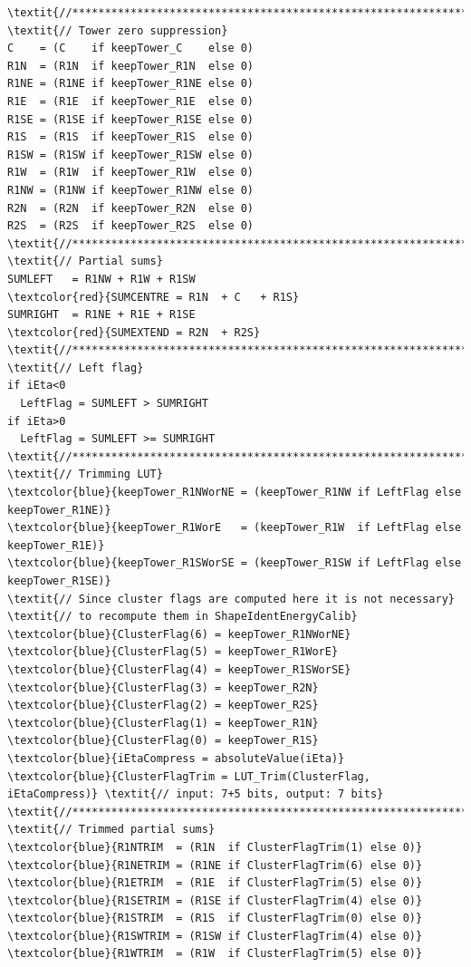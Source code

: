 \documentclass[a4paper, 12pt]{article}
\begin{document}
\begin{Verbatim}[label={EG cluster energy sums}]
\textit{//******************************************************************//}
\textit{// Tower zero suppression}
C    = (C    if keepTower_C    else 0)
R1N  = (R1N  if keepTower_R1N  else 0)
R1NE = (R1NE if keepTower_R1NE else 0)
R1E  = (R1E  if keepTower_R1E  else 0)
R1SE = (R1SE if keepTower_R1SE else 0)
R1S  = (R1S  if keepTower_R1S  else 0)
R1SW = (R1SW if keepTower_R1SW else 0)
R1W  = (R1W  if keepTower_R1W  else 0)
R1NW = (R1NW if keepTower_R1NW else 0)
R2N  = (R2N  if keepTower_R2N  else 0)
R2S  = (R2S  if keepTower_R2S  else 0)
\textit{//******************************************************************//}
\textit{// Partial sums}
SUMLEFT   = R1NW + R1W + R1SW
\textcolor{red}{SUMCENTRE = R1N  + C   + R1S}
SUMRIGHT  = R1NE + R1E + R1SE
\textcolor{red}{SUMEXTEND = R2N  + R2S}
\textit{//******************************************************************//}
\textit{// Left flag}
if iEta<0
  LeftFlag = SUMLEFT > SUMRIGHT
if iEta>0
  LeftFlag = SUMLEFT >= SUMRIGHT
\textit{//******************************************************************//}
\textit{// Trimming LUT}
\textcolor{blue}{keepTower_R1NWorNE = (keepTower_R1NW if LeftFlag else keepTower_R1NE)}
\textcolor{blue}{keepTower_R1WorE   = (keepTower_R1W  if LeftFlag else keepTower_R1E)}
\textcolor{blue}{keepTower_R1SWorSE = (keepTower_R1SW if LeftFlag else keepTower_R1SE)}
\textit{// Since cluster flags are computed here it is not necessary}
\textit{// to recompute them in ShapeIdentEnergyCalib}
\textcolor{blue}{ClusterFlag(6) = keepTower_R1NWorNE}
\textcolor{blue}{ClusterFlag(5) = keepTower_R1WorE}
\textcolor{blue}{ClusterFlag(4) = keepTower_R1SWorSE}
\textcolor{blue}{ClusterFlag(3) = keepTower_R2N}
\textcolor{blue}{ClusterFlag(2) = keepTower_R2S}
\textcolor{blue}{ClusterFlag(1) = keepTower_R1N}
\textcolor{blue}{ClusterFlag(0) = keepTower_R1S}
\textcolor{blue}{iEtaCompress = absoluteValue(iEta)}
\textcolor{blue}{ClusterFlagTrim = LUT_Trim(ClusterFlag, iEtaCompress)} \textit{// input: 7+5 bits, output: 7 bits}
\textit{//******************************************************************//}
\textit{// Trimmed partial sums}
\textcolor{blue}{R1NTRIM  = (R1N  if ClusterFlagTrim(1) else 0)}
\textcolor{blue}{R1NETRIM = (R1NE if ClusterFlagTrim(6) else 0)}
\textcolor{blue}{R1ETRIM  = (R1E  if ClusterFlagTrim(5) else 0)}
\textcolor{blue}{R1SETRIM = (R1SE if ClusterFlagTrim(4) else 0)}
\textcolor{blue}{R1STRIM  = (R1S  if ClusterFlagTrim(0) else 0)}
\textcolor{blue}{R1SWTRIM = (R1SW if ClusterFlagTrim(4) else 0)}
\textcolor{blue}{R1WTRIM  = (R1W  if ClusterFlagTrim(5) else 0)}

\end{Verbatim}
\end{document}
